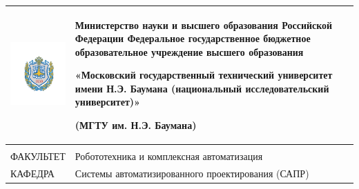 \documentclass[12pt, a4paper]{article}
\newcommand{\Faculty}{Робототехника и комплексная автоматизация}
\newcommand{\Department}{Системы автоматизированного проектирования (САПР)}
\begin{document}
	\thispagestyle{empty}
	\begin{tabular}{m{0.15\linewidth}m{0.85\linewidth}}
		\centering
		\includegraphics[scale=0.07]{static/bmstu.pdf} &
		{\centering
			Министерство науки и высшего образования Российской Федерации
			Федеральное государственное бюджетное образовательное учреждение
			высшего образования
			
			«Московский государственный технический университет
			имени Н.Э. Баумана
			(национальный исследовательский университет)»
			
			(МГТУ им. Н.Э. Баумана)
			
		} \\
		\hline
		\multicolumn{1}{p{0.15\textwidth}}{} & \multicolumn{1}{p{0.85\textwidth}}{} \\
		\multicolumn{1}{p{0.15\textwidth}}{ФАКУЛЬТЕТ}	&	\multicolumn{1}{p{0.85\textwidth}}{\Faculty}	\\
		\multicolumn{1}{p{0.15\textwidth}}{КАФЕДРА}	&	\multicolumn{1}{p{0.85\textwidth}}{\Department}	\\
	\end{tabular}
	\vfil
	
\end{document}
